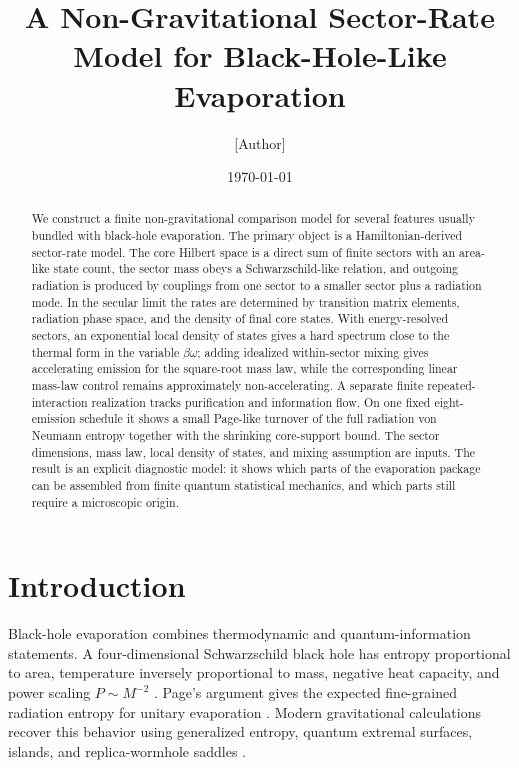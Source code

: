 \documentclass[aps,prd,onecolumn,longbibliography,nofootinbib]{revtex4-2}
\begin{document}
\title{A Non-Gravitational Sector-Rate Model for Black-Hole-Like Evaporation}

\author{[Author]}
\affiliation{[Affiliation]}
\date{\today}

\begin{abstract}
We construct a finite non-gravitational comparison model for several features
usually bundled with black-hole evaporation.  The primary object is a
Hamiltonian-derived sector-rate model.  The core Hilbert space is a direct sum
of finite sectors with an area-like state count, the sector mass obeys a
Schwarzschild-like relation, and outgoing radiation is produced by couplings
from one sector to a smaller sector plus a radiation mode.  In the secular
limit the rates are determined by transition matrix elements, radiation phase
space, and the density of final core states.  With energy-resolved sectors, an
exponential local density of states gives a hard spectrum close to the thermal
form in the variable $\beta\omega$; adding idealized within-sector mixing gives
accelerating emission for the square-root mass law, while the corresponding
linear mass-law control remains approximately non-accelerating.  A separate
finite repeated-interaction realization tracks purification and information
flow.  On one fixed eight-emission schedule it shows a small Page-like turnover
of the full radiation von Neumann entropy together with the shrinking
core-support bound.  The sector dimensions, mass law, local density of states,
and mixing assumption are inputs.  The result is an explicit diagnostic model:
it shows which parts of the evaporation package can be assembled from finite
quantum statistical mechanics, and which parts still require a microscopic
origin.
\end{abstract}

\maketitle

\section{Introduction}

Black-hole evaporation combines thermodynamic and quantum-information
statements.  A four-dimensional Schwarzschild black hole has entropy
proportional to area, temperature inversely proportional to mass, negative heat
capacity, and power scaling $P\sim M^{-2}$ \cite{Bekenstein1973,Hawking1975}.
Page's argument gives the expected fine-grained radiation entropy for unitary
evaporation \cite{Page1993Info,Page1993Average}.  Modern gravitational
calculations recover this behavior using generalized entropy, quantum extremal
surfaces, islands, and replica-wormhole saddles
\cite{Penington2020,AEMM2019,AlmheiriReview2021}.
\end{document}

